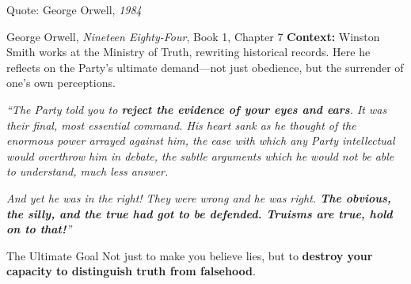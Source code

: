 \documentclass[aspectratio=169,11pt]{beamer}
\begin{document}
\begin{frame}{Quote: George Orwell, \textit{1984}}
\begin{exampleblock}{\faQuoteLeft\hspace{0.5em}George Orwell, \textit{Nineteen Eighty-Four}, Book 1, Chapter 7 \parencite{orwell_1984}}
\small
\textbf{Context:} Winston Smith works at the Ministry of Truth, rewriting historical records. Here he reflects on the Party's ultimate demand---not just obedience, but the surrender of one's own perceptions.

\vspace{0.5em}
\textit{``The Party told you to \textbf{reject the evidence of your eyes and ears}. It was their final, most essential command. His heart sank as he thought of the enormous power arrayed against him, the ease with which any Party intellectual would overthrow him in debate, the subtle arguments which he would not be able to understand, much less answer.}

\vspace{0.3em}
\textit{And yet he was in the right! They were wrong and he was right. \textbf{The obvious, the silly, and the true had got to be defended. Truisms are true, hold on to that!}''}
\end{exampleblock}

\vspace{0.2em}
\begin{block}{\faLightbulb\hspace{0.5em}The Ultimate Goal}
Not just to make you believe lies, but to \textbf{destroy your capacity to distinguish truth from falsehood}.
\end{block}
\end{frame}
\end{document}
